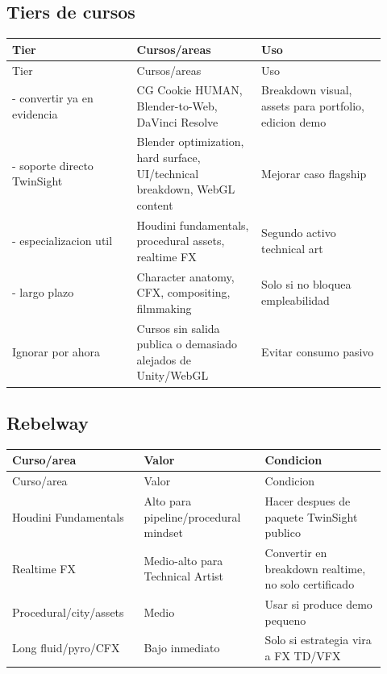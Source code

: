 \subsection{Tiers de cursos}


\begin{center}
\scriptsize
\begin{longtable}{>{\raggedright\arraybackslash}p{0.305\linewidth} >{\raggedright\arraybackslash}p{0.305\linewidth} >{\raggedright\arraybackslash}p{0.305\linewidth}}
\toprule
Tier & Cursos/areas & Uso \\
\midrule
\endfirsthead
\toprule
Tier & Cursos/areas & Uso \\
\midrule
\endhead
0 - convertir ya en evidencia & CG Cookie HUMAN, Blender-to-Web, DaVinci Resolve & Breakdown visual, assets para portfolio, edicion demo \\
1 - soporte directo TwinSight & Blender optimization, hard surface, UI/technical breakdown, WebGL content & Mejorar caso flagship \\
2 - especializacion util & Houdini fundamentals, procedural assets, realtime FX & Segundo activo technical art \\
3 - largo plazo & Character anatomy, CFX, compositing, filmmaking & Solo si no bloquea empleabilidad \\
Ignorar por ahora & Cursos sin salida publica o demasiado alejados de Unity/WebGL & Evitar consumo pasivo \\
\bottomrule
\end{longtable}
\end{center}


\subsection{Rebelway}


\begin{center}
\scriptsize
\begin{longtable}{>{\raggedright\arraybackslash}p{0.305\linewidth} >{\raggedright\arraybackslash}p{0.305\linewidth} >{\raggedright\arraybackslash}p{0.305\linewidth}}
\toprule
Curso/area & Valor & Condicion \\
\midrule
\endfirsthead
\toprule
Curso/area & Valor & Condicion \\
\midrule
\endhead
Houdini Fundamentals & Alto para pipeline/procedural mindset & Hacer despues de paquete TwinSight publico \\
Realtime FX & Medio-alto para Technical Artist & Convertir en breakdown realtime, no solo certificado \\
Procedural/city/assets & Medio & Usar si produce demo pequeno \\
Long fluid/pyro/CFX & Bajo inmediato & Solo si estrategia vira a FX TD/VFX \\
\bottomrule
\end{longtable}
\end{center}


